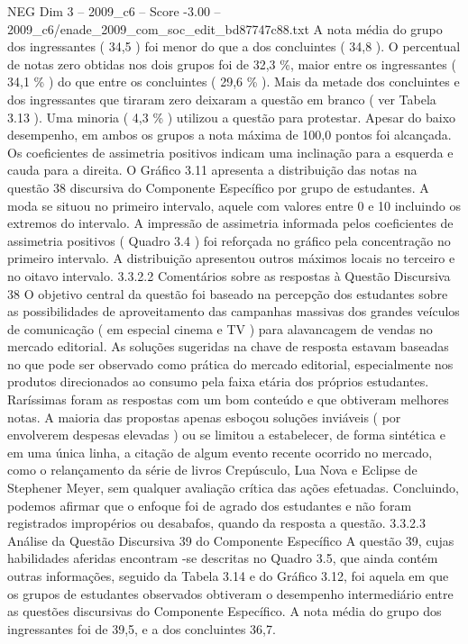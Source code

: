 \begin{textsample}{NEG Dim 3 – 2009\_c6 – Score -3.00 – 2009\_c6/enade\_2009\_com\_soc\_edit\_bd87747c88.txt}
A nota média do grupo dos ingressantes ( 34,5 ) foi menor do que a dos concluintes ( 34,8 ).
O percentual de notas zero obtidas nos dois grupos foi de 32,3 \%, maior entre os ingressantes ( 34,1 \% ) do que entre os concluintes ( 29,6 \% ).
Mais da metade dos concluintes e dos ingressantes que tiraram zero deixaram a questão em branco ( ver Tabela 3.13 ).
Uma minoria ( 4,3 \% ) utilizou a questão para protestar.
Apesar do baixo desempenho, em ambos os grupos a nota máxima de 100,0 pontos foi alcançada.
Os coeficientes de assimetria positivos indicam uma inclinação para a esquerda e cauda para a direita.
O Gráfico 3.11 apresenta a distribuição das notas na questão 38 discursiva do Componente Específico por grupo de estudantes.
A moda se situou no primeiro intervalo, aquele com valores entre 0 e 10 incluindo os extremos do intervalo.
A impressão de assimetria informada pelos coeficientes de assimetria positivos ( Quadro 3.4 ) foi reforçada no gráfico pela concentração no primeiro intervalo.
A distribuição apresentou outros máximos locais no terceiro e no oitavo intervalo. 3.3.2.2 Comentários sobre as respostas à Questão Discursiva 38 O objetivo central da questão foi baseado na percepção dos estudantes sobre as possibilidades de aproveitamento das campanhas massivas dos grandes veículos de comunicação ( em especial cinema e TV ) para alavancagem de vendas no mercado editorial.
As soluções sugeridas na chave de resposta estavam baseadas no que pode ser observado como prática do mercado editorial, especialmente nos produtos direcionados ao consumo pela faixa etária dos próprios estudantes.
Raríssimas foram as respostas com um bom conteúdo e que obtiveram melhores notas.
A maioria das propostas apenas esboçou soluções inviáveis ( por envolverem despesas elevadas ) ou se limitou a estabelecer, de forma sintética e em uma única linha, a citação de algum evento recente ocorrido no mercado, como o relançamento da série de livros Crepúsculo, Lua Nova e Eclipse de Stephener Meyer, sem qualquer avaliação crítica das ações efetuadas.
Concluindo, podemos afirmar que o enfoque foi de agrado dos estudantes e não foram registrados impropérios ou desabafos, quando da resposta a questão. 3.3.2.3 Análise da Questão Discursiva 39 do Componente Específico A questão 39, cujas habilidades aferidas encontram -se descritas no Quadro 3.5, que ainda contém outras informações, seguido da Tabela 3.14 e do Gráfico 3.12, foi aquela em que os grupos de estudantes observados obtiveram o desempenho intermediário entre as questões discursivas do Componente Específico.
A nota média do grupo dos ingressantes foi de 39,5, e a dos concluintes 36,7.

\end{textsample}
